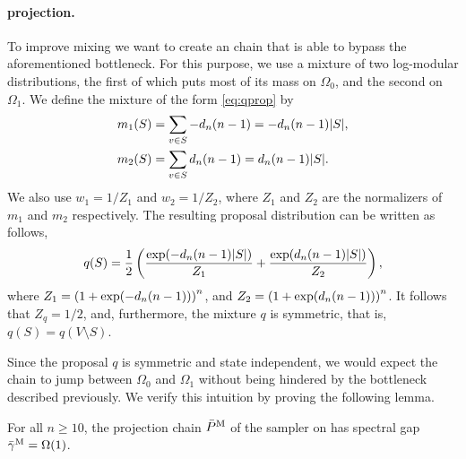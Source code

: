 \paragraph{\Ms{} projection.}
To improve mixing we want to create an \Ms{} chain that is able to bypass the aforementioned bottleneck.
For this purpose, we use a mixture of two log-modular distributions, the first of which puts most of its mass on $\Omega_0$, and the second on $\Omega_1$.
We define the mixture of the form \eqref{eq:qprop} by
\begin{align*}
  m_1(S) &= \sum_{v \in S} -d_n (n-1) = -d_n (n-1) |S|,\\
  m_2(S) &= \sum_{v \in S} d_n (n-1) = d_n (n-1) |S|.
\end{align*}
We also use $w_1 = 1 / Z_1$ and $w_2 = 1 / Z_2$, where $Z_1$ and $Z_2$ are the normalizers of $m_1$ and $m_2$ respectively.
The resulting proposal distribution can be written as follows,
\begin{align} \label{eq:qdef}
  q(S) = \frac12\left( \frac{\exp(-d_n (n-1)|S|)}{Z_1} + \frac{\exp(d_n (n-1)|S|)}{Z_2}\right),
\end{align}
where $Z_1 = \left(1 + \exp(-d_n(n-1))\right)^n$, and $Z_2 = \left(1 + \exp(d_n(n-1))\right)^n$.
It follows that $Z_q = 1 / 2$, and, furthermore, the mixture $q$ is symmetric, that is, $q(S) = q(V \setminus S)$.

Since the proposal $q$ is symmetric and state independent, we would expect the \Ms{} chain to jump between $\Omega_0$ and $\Omega_1$ without being hindered by the bottleneck described previously.
We verify this intuition by proving the following lemma.
\begin{lemma} \label{lem:mproj}
  For all $n \geq 10$, the projection chain $\bar{P}^{\mathrm{M}}$ of the \Ms{} sampler on \ising{} has spectral gap $\bar{\gamma}^{\mathrm{M}} = \Omega(1)$.
\end{lemma}

